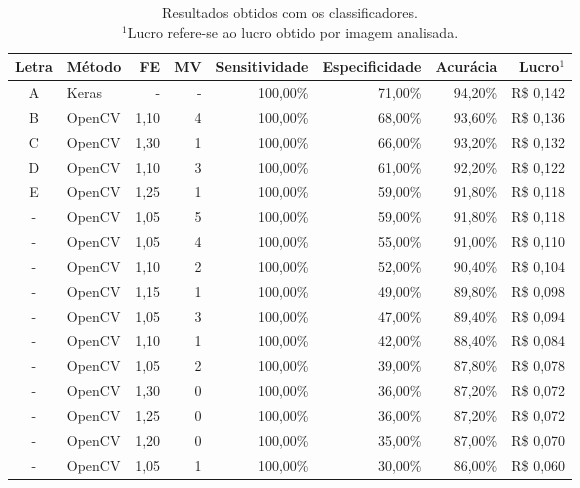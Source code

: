 \begin{table}[htbp]
    \caption{Resultados obtidos com os classificadores.\\$^1$Lucro refere-se ao lucro obtido por imagem analisada.}
    \label{tab:results_identify}
    \centering
    \begin{tabular}{clrrrrrr}
        Letra & Método & FE   & MV & Sensitividade & Especificidade & Acurácia & Lucro$^1$  \\
        \midrule
        A     & Keras  & -    & -  & 100,00\%      & 71,00\%        & 94,20\%  & R\$ 0,142  \\
        B     & OpenCV & 1,10 & 4  & 100,00\%      & 68,00\%        & 93,60\%  & R\$ 0,136  \\
        C     & OpenCV & 1,30 & 1  & 100,00\%      & 66,00\%        & 93,20\%  & R\$ 0,132  \\
        D     & OpenCV & 1,10 & 3  & 100,00\%      & 61,00\%        & 92,20\%  & R\$ 0,122  \\
        E     & OpenCV & 1,25 & 1  & 100,00\%      & 59,00\%        & 91,80\%  & R\$ 0,118  \\
        -     & OpenCV & 1,05 & 5  & 100,00\%      & 59,00\%        & 91,80\%  & R\$ 0,118  \\
        -     & OpenCV & 1,05 & 4  & 100,00\%      & 55,00\%        & 91,00\%  & R\$ 0,110  \\
        -     & OpenCV & 1,10 & 2  & 100,00\%      & 52,00\%        & 90,40\%  & R\$ 0,104  \\
        -     & OpenCV & 1,15 & 1  & 100,00\%      & 49,00\%        & 89,80\%  & R\$ 0,098  \\
        -     & OpenCV & 1,05 & 3  & 100,00\%      & 47,00\%        & 89,40\%  & R\$ 0,094  \\
        -     & OpenCV & 1,10 & 1  & 100,00\%      & 42,00\%        & 88,40\%  & R\$ 0,084  \\
        -     & OpenCV & 1,05 & 2  & 100,00\%      & 39,00\%        & 87,80\%  & R\$ 0,078  \\
        -     & OpenCV & 1,30 & 0  & 100,00\%      & 36,00\%        & 87,20\%  & R\$ 0,072  \\
        -     & OpenCV & 1,25 & 0  & 100,00\%      & 36,00\%        & 87,20\%  & R\$ 0,072  \\
        -     & OpenCV & 1,20 & 0  & 100,00\%      & 35,00\%        & 87,00\%  & R\$ 0,070  \\
        -     & OpenCV & 1,05 & 1  & 100,00\%      & 30,00\%        & 86,00\%  & R\$ 0,060  \\

\end{tabular}
\end{table}

